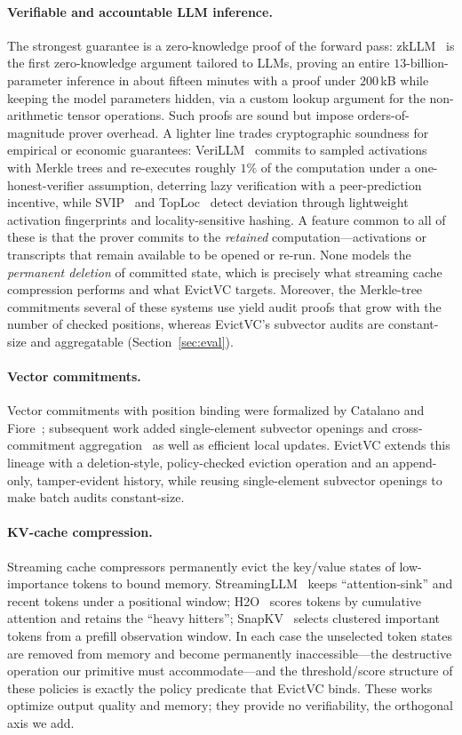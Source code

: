 \paragraph{Verifiable and accountable LLM inference.}
The strongest guarantee is a zero-knowledge proof of the forward pass:
zkLLM~\cite{zkllm} is the first zero-knowledge argument tailored to LLMs, proving
an entire $13$-billion-parameter inference in about fifteen minutes with a proof
under $200$\,kB while keeping the model parameters hidden, via a custom lookup
argument for the non-arithmetic tensor operations. Such proofs are sound but
impose orders-of-magnitude prover overhead. A lighter line trades cryptographic
soundness for empirical or economic guarantees: VeriLLM~\cite{verillm} commits to
sampled activations with Merkle trees and re-executes roughly $1\%$ of the
computation under a one-honest-verifier assumption, deterring lazy verification
with a peer-prediction incentive, while SVIP~\cite{svip} and
TopLoc~\cite{toploc} detect deviation through lightweight activation fingerprints
and locality-sensitive hashing. A feature common to all of these is that the
prover commits to the \emph{retained} computation---activations or transcripts
that remain available to be opened or re-run. None models the \emph{permanent
deletion} of committed state, which is precisely what streaming cache compression
performs and what EvictVC targets. Moreover, the Merkle-tree commitments several
of these systems use yield audit proofs that grow with the number of checked
positions, whereas EvictVC's subvector audits are constant-size and aggregatable
(Section~\ref{sec:eval}).

\paragraph{Vector commitments.}
Vector commitments with position binding were formalized by Catalano and
Fiore~\cite{cf13}; subsequent work added single-element subvector openings and
cross-commitment aggregation~\cite{tomescu} as well as efficient local updates.
EvictVC extends this lineage with a deletion-style, policy-checked eviction
operation and an append-only, tamper-evident history, while reusing
single-element subvector openings to make batch audits constant-size.

\paragraph{KV-cache compression.}
Streaming cache compressors permanently evict the key/value states of
low-importance tokens to bound memory. StreamingLLM~\cite{streamingllm} keeps
``attention-sink'' and recent tokens under a positional window; H2O~\cite{h2o}
scores tokens by cumulative attention and retains the ``heavy hitters'';
SnapKV~\cite{snapkv} selects clustered important tokens from a prefill
observation window. In each case the unselected token states are removed from
memory and become permanently inaccessible---the destructive operation our
primitive must accommodate---and the threshold/score structure of these policies
is exactly the policy predicate that EvictVC binds. These works optimize output
quality and memory; they provide no verifiability, the orthogonal axis we add.


